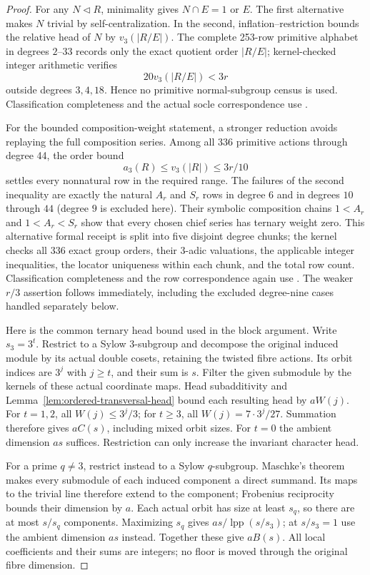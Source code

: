 \begin{proof}
For any $N\triangleleft R$, minimality gives $N\cap E=1$ or $E$.
The first alternative makes $N$ trivial by self-centralization. In the
second, inflation--restriction bounds the relative head of $N$ by
$v_3(|R/E|)$. The complete 253-row primitive alphabet in degrees
$2$--$33$ records only the exact quotient order $|R/E|$; kernel-checked
integer arithmetic verifies
\[
 20v_3(|R/E|)<3r
\]
outside degrees $3,4,18$. Hence no primitive normal-subgroup census is
used. Classification completeness and the actual socle correspondence
use \cite{RoneyDougal2005Primitive,PrimGrp344}.

For the bounded composition-weight statement, a stronger reduction avoids
replaying the full composition series.  Among all 336 primitive actions
through degree 44, the order bound
\[
 a_3(R)\leq v_3(|R|)\leq 3r/10
\]
settles every nonnatural row in the required range.  The failures of the
second inequality are exactly the natural $A_r$ and $S_r$ rows in degree
$6$ and in degrees $10$ through $44$ (degree $9$ is excluded here).
Their symbolic composition chains
$1<A_r$ and $1<A_r<S_r$ show that every chosen chief series has ternary
weight zero.  This alternative formal receipt is split into five disjoint degree chunks;
the kernel checks all 336 exact group orders, their $3$-adic valuations,
the applicable integer inequalities, the locator uniqueness within each
chunk, and the total row count.  Classification completeness and the row
correspondence again use \cite{RoneyDougal2005Primitive,PrimGrp344}.
The weaker $r/3$ assertion follows immediately, including the excluded
degree-nine cases handled separately below.

Here is the common ternary head bound used in the block argument.
Write $s_3=3^t$. Restrict to a Sylow $3$-subgroup and decompose the
original induced module by its actual double cosets, retaining the
twisted fibre actions. Its orbit indices are $3^j$ with $j\geq t$,
and their sum is $s$. Filter the given submodule by the kernels of
these actual coordinate maps. Head subadditivity and
Lemma~\ref{lem:ordered-transversal-head} bound each resulting head
by $aW(j)$. For $t=1,2$, all $W(j)\leq3^j/3$; for $t\geq3$,
all $W(j)=7\cdot3^j/27$. Summation therefore gives $aC(s)$,
including mixed orbit sizes. For $t=0$ the ambient dimension $as$
suffices. Restriction can only increase the invariant character head.

For a prime $q\ne3$, restrict instead to a Sylow $q$-subgroup.
Maschke's theorem makes every submodule of each induced component
a direct summand. Its maps to the trivial line therefore extend to
the component; Frobenius reciprocity bounds their dimension by $a$.
Each actual orbit has size at least $s_q$, so there are at most
$s/s_q$ components. Maximizing $s_q$ gives
$as/\operatorname{lpp}(s/s_3)$; at $s/s_3=1$ use the ambient
dimension $as$ instead.
Together these give $aB(s)$. All local coefficients and their sums
are integers; no floor is moved through the original fibre dimension.


\end{proof}
